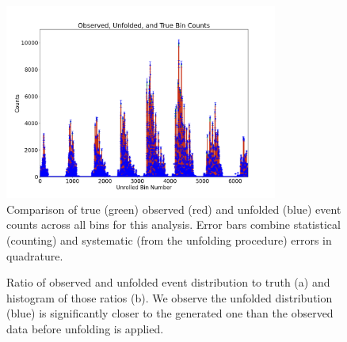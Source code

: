     \begin{figure}[H]
        \centering
        \includegraphics[trim={0 0 0 0},clip,width=0.8\textwidth]{Chapters/Ch5-Further/0_IBU/pics/complete/final_observed_unfolded_and_true_bin_counts.png}
        \caption[Comparison of Truth, Observed, and Unfolded Distributions]{Comparison of true (green) observed (red) and unfolded (blue) event counts across all bins for this analysis. Error bars combine statistical (counting) and systematic (from the unfolding procedure) errors in quadrature.}
        \label{fig:ibufullresult}
    \end{figure}
    
    \begin{figure}[ht]
        \centering
        \caption[Full Unfolding Residuals]{Ratio of observed and unfolded event distribution to truth (a) and histogram of those ratios (b). We observe the unfolded distribution (blue) is significantly closer to the generated one than the observed data before unfolding is applied.}
        \label{fig:residualsIBU}
    \end{figure}
    


